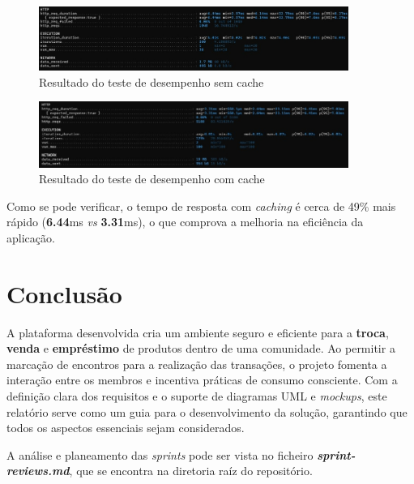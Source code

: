 \documentclass[a4paper, 12pt]{article} %
\begin{document}
\begin{figure}[ht]
	\centering
	\includegraphics[width=0.9\textwidth]{../images/performance-test-non-cached.jpg}
	\caption{Resultado do teste de desempenho sem cache}
	\label{fig:resultado_teste_desempenho_sem_cache}
\end{figure}

\begin{figure}[ht]
	\centering
	\includegraphics[width=0.9\textwidth]{../images/performance-test-cached.jpg}
	\caption{Resultado do teste de desempenho com cache}
	\label{fig:resultado_teste_desempenho_com_cache}
\end{figure}

Como se pode verificar, o tempo de resposta com \textit{caching} é cerca de 49\% mais rápido (\textbf{6.44}ms \textit{vs} \textbf{3.31}ms), o que comprova a melhoria na eficiência da aplicação.



\newpage
\section{Conclusão}

A plataforma desenvolvida cria um ambiente seguro e eficiente para a \textbf{troca}, \textbf{venda} e \textbf{empréstimo} de produtos dentro de uma comunidade. Ao permitir a marcação de encontros para a realização das transações, o projeto fomenta a interação entre os membros e incentiva práticas de consumo consciente. 
Com a definição clara dos requisitos e o suporte de diagramas UML e \textit{mockups}, este relatório serve como um guia para o desenvolvimento da solução, garantindo que todos os aspectos essenciais sejam considerados.

A análise e planeamento das \textit{sprints} pode ser vista no ficheiro \textbf{\textit{sprint-reviews.md}}, que se encontra na diretoria raíz do repositório.

\newpage
\nocite{*}

\printbibliography
\end{document}
